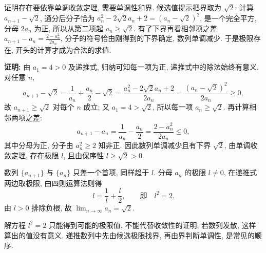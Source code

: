 \documentclass[UTF8,openany]{ctexbook}
\theoremstyle{chinesetextbook}
\newenvironment{cnproof}{\par\indent\textbf{证明:} \ignorespaces}{\par}
\begin{document}
证明存在要依靠单调收敛定理, 需要单调性和界. 候选值提示把界取为 $\sqrt2$: 计算 $a_{n+1}-\sqrt2$, 通分后分子恰为 $a_n^2-2\sqrt2a_n+2=(a_n-\sqrt2)^2$, 是一个完全平方, 分母 $2a_n$ 为正, 所以从第二项起 $a_n\ge\sqrt2$. 有了下界再看相邻项之差 $\displaystyle a_{n+1}-a_n=\frac{2-a_n^2}{2a_n}$, 分子的符号恰由刚得到的下界确定, 数列单调减少. 于是极限存在, 开头的计算才成为合法的求值.
\begin{cnproof}
由 $a_1=4>0$ 及递推式, 归纳可知每一项为正, 递推式中的除法始终有意义. 对任意 $n$,
\[
a_{n+1}-\sqrt2
=\frac1{a_n}+\frac{a_n}2-\sqrt2
=\frac{a_n^2-2\sqrt2a_n+2}{2a_n}
=\frac{(a_n-\sqrt2)^2}{2a_n}\ge0,
\]
故 $a_{n+1}\ge\sqrt2$ 对每个 $n$ 成立; 又 $a_1=4>\sqrt2$, 所以每一项 $a_n\ge\sqrt2$. 再计算相邻两项之差:
\[
a_{n+1}-a_n=\frac1{a_n}-\frac{a_n}2=\frac{2-a_n^2}{2a_n}\le0,
\]
其中分母为正, 分子由 $a_n^2\ge2$ 知非正. 因此数列单调减少且有下界 $\sqrt2$, 由单调收敛定理, 存在极限 $l$, 且由保序性 $l\ge\sqrt2>0$.

数列 $\{a_{n+1}\}$ 与 $\{a_n\}$ 只差一个首项, 同样趋于 $l$. 分母 $a_n$ 的极限 $l\ne0$, 在递推式两边取极限, 由四则运算法则得
\[
l=\frac1l+\frac l2,\qquad\text{即}\quad l^2=2.
\]
由 $l>0$ 排除负根, 故 $\displaystyle\lim_{n\to\infty}a_n=\sqrt2$.
\end{cnproof}
解方程 $l^2=2$ 只能得到可能的极限值, 不能代替收敛性的证明; 若数列发散, 这样算出的值没有意义. 递推数列中先由候选极限找界, 再由界判断单调性, 是常见的顺序.
\end{document}
